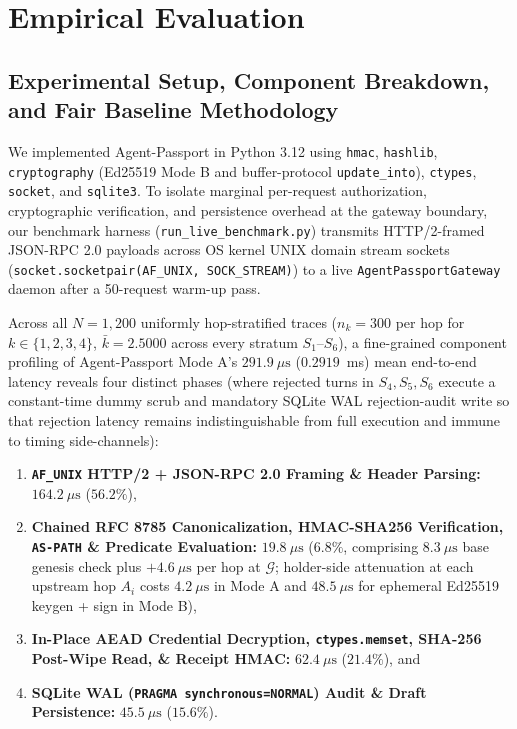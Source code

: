\documentclass[conference,10pt]{IEEEtran}
\begin{document}
\section{Empirical Evaluation}

\subsection{Experimental Setup, Component Breakdown, and Fair Baseline Methodology}
We implemented Agent-Passport in Python 3.12 using \texttt{hmac}, \texttt{hashlib}, \texttt{cryptography} (Ed25519 Mode B and buffer-protocol \texttt{update\_into}), \texttt{ctypes}, \texttt{socket}, and \texttt{sqlite3}. To isolate marginal per-request authorization, cryptographic verification, and persistence overhead at the gateway boundary, our benchmark harness (\texttt{run\_live\_benchmark.py}) transmits HTTP/2-framed JSON-RPC 2.0 payloads across OS kernel UNIX domain stream sockets (\texttt{socket.socketpair(AF\_UNIX, SOCK\_STREAM)}) to a live \texttt{AgentPassportGateway} daemon after a 50-request warm-up pass.

Across all $N = 1{,}200$ uniformly hop-stratified traces ($n_k = 300$ per hop for $k \in \{1, 2, 3, 4\}$, $\bar{k} = 2.5000$ across every stratum $S_1\text{--}S_6$), a fine-grained component profiling of Agent-Passport Mode A's $291.9~\mu\text{s}$ ($0.2919$~ms) mean end-to-end latency reveals four distinct phases (where rejected turns in $S_4, S_5, S_6$ execute a constant-time dummy scrub and mandatory SQLite WAL rejection-audit write so that rejection latency remains indistinguishable from full execution and immune to timing side-channels):
\begin{enumerate}
    \item \textbf{\texttt{AF\_UNIX} HTTP/2 + JSON-RPC 2.0 Framing \& Header Parsing:} $164.2~\mu\text{s}$ ($56.2\%$),
    \item \textbf{Chained RFC 8785 Canonicalization, HMAC-SHA256 Verification, \texttt{AS-PATH} \& Predicate Evaluation:} $19.8~\mu\text{s}$ ($6.8\%$, comprising $8.3~\mu\text{s}$ base genesis check plus $+4.6~\mu\text{s}$ per hop at $\mathcal{G}$; holder-side attenuation at each upstream hop $A_i$ costs $4.2~\mu\text{s}$ in Mode A and $48.5~\mu\text{s}$ for ephemeral Ed25519 keygen + sign in Mode B),
    \item \textbf{In-Place AEAD Credential Decryption, \texttt{ctypes.memset}, SHA-256 Post-Wipe Read, \& Receipt HMAC:} $62.4~\mu\text{s}$ ($21.4\%$), and
    \item \textbf{SQLite WAL (\texttt{PRAGMA synchronous=NORMAL}) Audit \& Draft Persistence:} $45.5~\mu\text{s}$ ($15.6\%$).
\end{enumerate}
\end{document}
